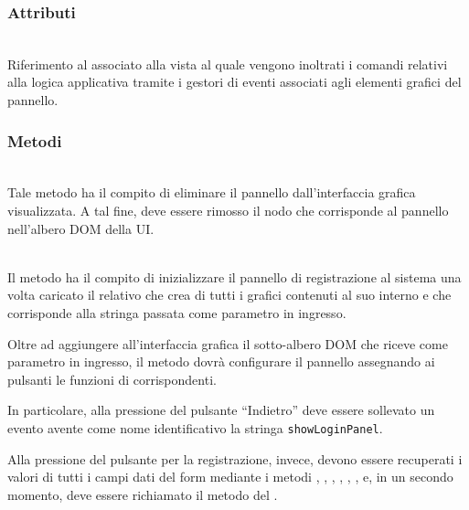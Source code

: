 \subsubsection*{Attributi}
\begin{description}
  \item{}\\
  Riferimento al  associato alla vista al quale vengono inoltrati i comandi relativi alla logica applicativa tramite i gestori di eventi associati agli elementi grafici del pannello.
\end{description}

\subsubsection*{Metodi}
\begin{description}
  \item{}\\
  Tale metodo ha il compito di eliminare il pannello dall’interfaccia grafica visualizzata. A tal fine, deve essere rimosso il nodo che corrisponde al pannello nell’albero DOM della UI\@.
  
  \item{}\\
  	Il metodo ha il compito di inizializzare il pannello di registrazione al sistema una volta caricato il relativo  che crea di tutti i  grafici contenuti al suo interno e che corrisponde alla stringa passata come parametro in ingresso.
	
	Oltre ad aggiungere all'interfaccia grafica il sotto-albero DOM che riceve come parametro in ingresso, il metodo dovrà configurare il pannello assegnando ai pulsanti le funzioni di  corrispondenti.
	
	In particolare, alla pressione del pulsante ``Indietro'' deve essere sollevato un evento avente come nome identificativo la stringa \verb'showLoginPanel'.
	
  Alla pressione del pulsante per la registrazione, invece, devono essere recuperati i valori di tutti i campi dati del form mediante i metodi , , , , , ,  e, in un secondo momento, deve essere richiamato il metodo  del .
  

\end{description}

